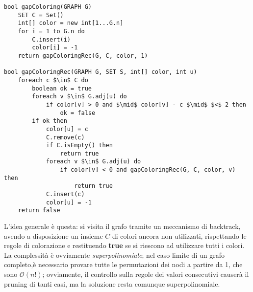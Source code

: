 \documentclass[../cheatSheetAlgoritmi.tex]{subfiles}
\begin{document}
\begin{lstlisting}[caption=n-Colorazione (gapColoring)]
bool gapColoring(GRAPH G)
	SET C = Set()
	int[] color = new int[1...G.n]
	for i = 1 to G.n do
		C.insert(i)
		color[i] = -1
	return gapColoringRec(G, C, color, 1)
	
bool gapColoringRec(GRAPH G, SET S, int[] color, int u)
	foreach c $\in$ C do
		boolean ok = true
		foreach v $\in$ G.adj(u) do
			if color[v] > 0 and $\mid$ color[v] - c $\mid$ $<$ 2 then
				ok = false
		if ok then
			color[u] = c
			C.remove(c)
			if C.isEmpty() then
				return true
			foreach v $\in$ G.adj(u) do
				if color[v] < 0 and gapColoringRec(G, C, color, v) then
					return true
			C.insert(c)
			color[u] = -1
	return false
\end{lstlisting}
L'idea generale è questa: si visita il grafo tramite un meccanismo di backtrack, avendo a disposizione un insieme $C$ di colori ancora non utilizzati, rispettando le regole di colorazione e restituendo \textbf{true} se si riescono ad utilizzare tutti i colori. La complessità è ovviamente \emph{superpolinomiale}; nel caso limite di un grafo completo,è necessario provare tutte le permutazioni dei nodi a partire da 1, che sono $\mathcal{O}(n!)$; ovviamente, il controllo sulla regole dei valori consecutivi causerà il pruning di tanti casi, ma la soluzione resta comunque superpolinomiale.
\newpage
\end{document}
